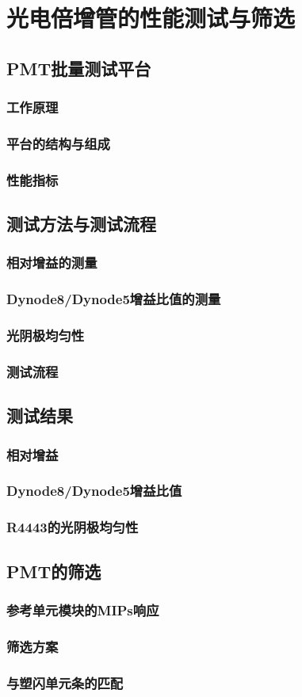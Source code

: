 \chapter{光电倍增管的性能测试与筛选}
\label{ch:pmt}

\section{PMT批量测试平台}
\subsection{工作原理}
\subsection{平台的结构与组成}
\subsection{性能指标}

\section{测试方法与测试流程}
\subsection{相对增益的测量}
\subsection{Dynode8/Dynode5增益比值的测量}
\subsection{光阴极均匀性}
\subsection{测试流程}

\section{测试结果}
\subsection{相对增益}
\subsection{Dynode8/Dynode5增益比值}
\subsection{R4443的光阴极均匀性}

\section{PMT的筛选}
\subsection{参考单元模块的MIPs响应}
\subsection{筛选方案}
\subsection{与塑闪单元条的匹配}